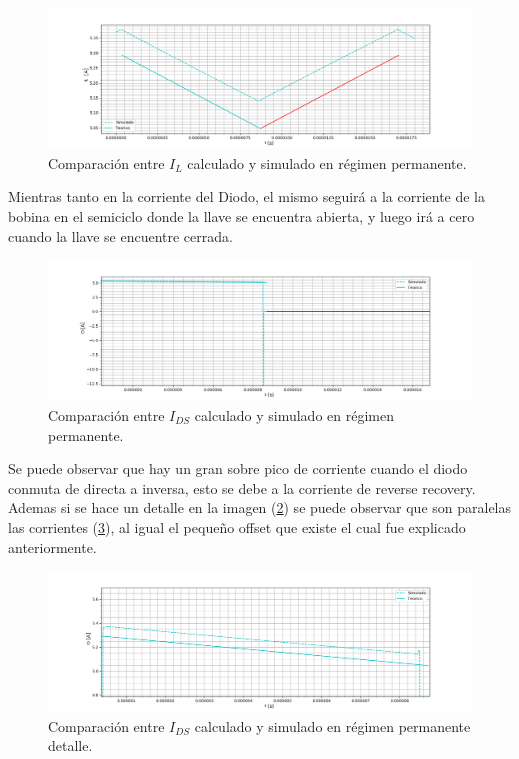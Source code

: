 \begin{figure}[H]
	\centering
	\includegraphics[width=0.8\linewidth]{ImagenesEjercicio-1/il_permanente_sim}
	\caption{Comparación entre $I_L$ calculado y simulado en régimen permanente.}
	\label{ej1:fig:il_permanente_sum}
\end{figure}
Mientras tanto en la corriente del Diodo, el mismo seguirá a la corriente de la bobina en el semiciclo donde la llave se encuentra abierta, y luego irá a cero cuando la llave se encuentre cerrada.
\begin{figure}[H]
	\centering
	\includegraphics[width=0.9\linewidth]{ImagenesEjercicio-1/id_permanente_sim}
	\caption{Comparación entre $I_{DS}$ calculado y simulado en régimen permanente.}
	\label{ej1:fig:id_permanente_sum}
\end{figure}
Se puede observar que hay un gran sobre pico de corriente cuando el diodo conmuta de directa a inversa, esto se debe a la corriente de reverse recovery.
Ademas si se hace un detalle en la imagen (\ref{ej1:fig:id_permanente_sum}) se puede observar que son paralelas las corrientes (\ref{ej1:fig:id_permanente_sum_det}), al igual el pequeño offset que existe el cual fue explicado anteriormente.
\begin{figure}[H]
	\centering
	\includegraphics[width=0.9\linewidth]{ImagenesEjercicio-1/id_permanente_sim_det}
	\caption{Comparación entre $I_{DS}$ calculado y simulado en régimen permanente detalle.}
	\label{ej1:fig:id_permanente_sum_det}
\end{figure}

